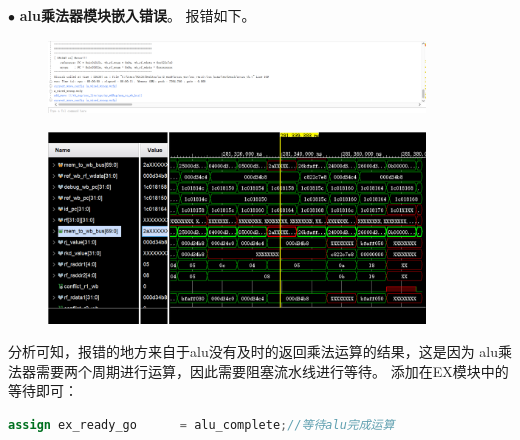 \documentclass[11pt]{article}
\begin{document}
\noindent
$\bullet$
\textbf{alu乘法器模块嵌入错误}。
报错如下。
\begin{figure}[H]
  \centering
  \includegraphics[width=10cm]{fig/2.png}
\end{figure}
\begin{figure}[H]
  \centering
  \includegraphics[width=10cm]{fig/3.png}
\end{figure}

分析可知，报错的地方来自于alu没有及时的返回乘法运算的结果，这是因为
alu乘法器需要两个周期进行运算，因此需要阻塞流水线进行等待。
添加在EX模块中的等待即可：
\begin{lstlisting}[language=verilog]
  assign ex_ready_go      = alu_complete;//等待alu完成运算
\end{lstlisting}
\end{document}
